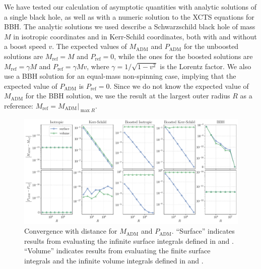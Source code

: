 \documentclass{../document}
\begin{document}
      We have tested our calculation of asymptotic quantities with analytic solutions of a single black hole, as well as with a numeric solution to the XCTS equations for BBH. The analytic solutions we used describe a Schwarzschild black hole of mass $M$ in isotropic coordinates and in Kerr-Schild coordinates, both with and without a boost speed $v$. The expected values of $M_\text{ADM}$ and $P_\text{ADM}$ for the unboosted solutions are $M_\text{ref} = M$ and $P_\text{ref} = 0$, while the ones for the boosted solutions are $M_\text{ref} = \gamma M$ and $P_\text{ref} = \gamma M v$, where $\gamma = 1 / \sqrt{1 - v^2}$ is the Lorentz factor. We also use a BBH solution for an equal-mass non-spinning case, implying that the expected value of $P_\text{ADM}$ is $P_\text{ref} = 0$. Since we do not know the expected value of $M_\text{ADM}$ for the BBH solution, we use the result at the largest outer radius $R$ as a reference: $M_\text{ref} = M_\text{ADM} |_{\max R}$.

      \begin{figure}
        \centering
        \includegraphics[width=\textwidth]{../../plots/final_report/distance_convergence_Madm_Padm.pdf}
        \caption{Convergence with distance for $M_\text{ADM}$ and $P_\text{ADM}$. ``Surface'' indicates results from evaluating the infinite surface integrals defined in \eq{\eqref{eq:Madm-surf}} and \eq{\eqref{eq:Padm-surf}}. ``Volume'' indicates results from evaluating the finite surface integrals and the infinite volume integrals defined in \eq{\eqref{eq:Madm-mixed}} and \eq{\eqref{eq:Padm-mixed}}.}
        \label{fig:distance_convergence_Madm_Padm}
      \end{figure}
\end{document}
